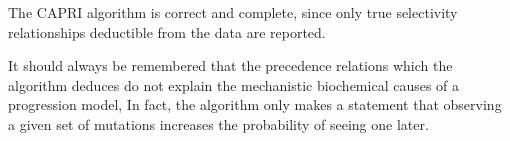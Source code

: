 The CAPRI algorithm is correct and complete, since only true selectivity relationships deductible from the data are
reported.

It should always be remembered that the precedence relations which the algorithm deduces do not explain the 
mechanistic biochemical causes of a progression model, In fact, the algorithm only makes a statement that 
observing a given set of mutations increases the probability of seeing one later.